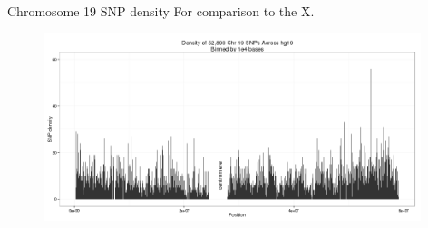 \documentclass{beamer}
\begin{document}
\begin{frame}{Chromosome 19 SNP density}
For comparison to the X.
\begin{figure}
\includegraphics[width=11cm]{chr19_density.png}
\end{figure}
\end{frame}
\end{document}
